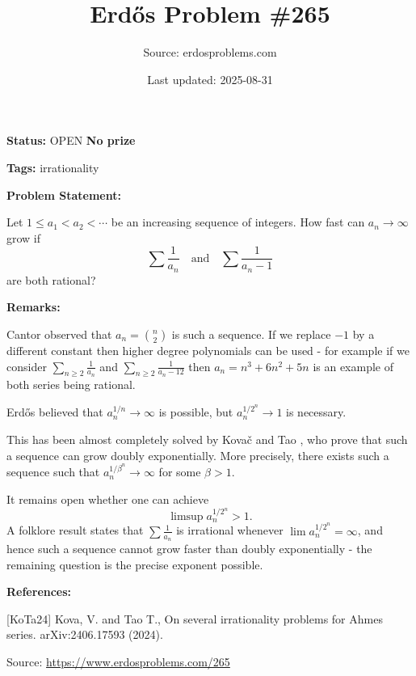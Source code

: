 \documentclass{article}
\title{Erd\H{o}s Problem \#265}
\date{Last updated: 2025-08-31}
\author{Source: erdosproblems.com}
\begin{document}
\maketitle

\noindent\textbf{Status:} OPEN \quad \textbf{No prize}

\noindent\textbf{Tags:} irrationality

\medskip
\noindent\textbf{Problem Statement:}

Let $1\leq a_1<a_2<\cdots$ be an increasing sequence of integers. How fast can $a_n\to \infty$ grow if\[\sum\frac{1}{a_n}\quad\textrm{and}\quad\sum\frac{1}{a_n-1}\]are both rational?

\bigskip
\noindent\textbf{Remarks:}

Cantor observed that $a_n=\binom{n}{2}$ is such a sequence. If we replace $-1$ by a different constant then higher degree polynomials can be used - for example if we consider $\sum_{n\geq 2}\frac{1}{a_n}$ and $\sum_{n\geq 2}\frac{1}{a_n-12}$ then $a_n=n^3+6n^2+5n$ is an example of both series being rational.

Erd\H{o}s believed that $a_n^{1/n}\to \infty$ is possible, but $a_n^{1/2^n}\to 1$ is necessary.

This has been almost completely solved by Kova\v{c} and Tao \cite{KoTa24}, who prove that such a sequence can grow doubly exponentially. More precisely, there exists such a sequence such that $a_n^{1/\beta^n}\to \infty$ for some $\beta >1$.

It remains open whether one can achieve\[\limsup a_n^{1/2^n}>1.\]A folklore result states that $\sum \frac{1}{a_n}$ is irrational whenever $\lim a_n^{1/2^n}=\infty$, and hence such a sequence cannot grow faster than doubly exponentially - the remaining question is the precise exponent possible.

\bigskip
\noindent\textbf{References:}

[KoTa24] Kova\vC, V. and Tao T., On several irrationality problems for Ahmes series. arXiv:2406.17593 (2024).

\bigskip
\noindent\small{Source: \url{https://www.erdosproblems.com/265}}
\end{document}
